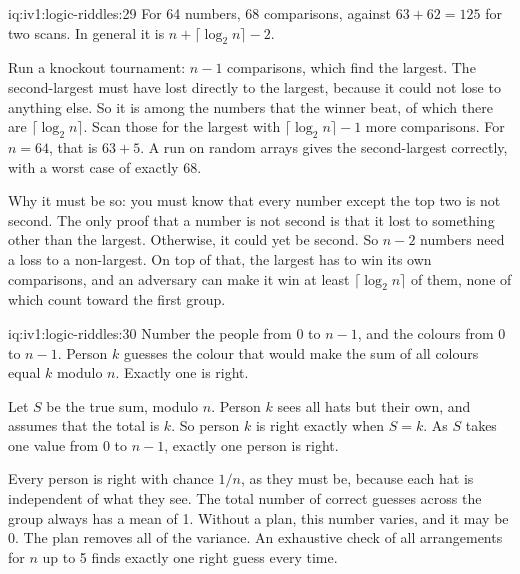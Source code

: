 \begin{solution}{iq:iv1:logic-riddles:29}
For 64 numbers, 68 comparisons, against $63 + 62 = 125$ for two scans. In general it is $n + \lceil \log_2 n \rceil - 2$.

Run a knockout tournament: $n - 1$ comparisons, which find the largest. The second-largest must have lost directly to the largest, because it could not lose to anything else. So it is among the numbers that the winner beat, of which there are $\lceil \log_2 n \rceil$. Scan those for the largest with $\lceil \log_2 n \rceil - 1$ more comparisons. For $n = 64$, that is $63 + 5$. A run on random arrays gives the second-largest correctly, with a worst case of exactly 68.

Why it must be so: you must know that every number except the top two is not second. The only proof that a number is not second is that it lost to something other than the largest. Otherwise, it could yet be second. So $n - 2$ numbers need a loss to a non-largest. On top of that, the largest has to win its own comparisons, and an adversary can make it win at least $\lceil \log_2 n \rceil$ of them, none of which count toward the first group.

\end{solution}

\begin{solution}{iq:iv1:logic-riddles:30}
Number the people from 0 to $n - 1$, and the colours from 0 to $n - 1$. Person $k$ guesses the colour that would make the sum of all colours equal $k$ modulo $n$. Exactly one is right.

Let $S$ be the true sum, modulo $n$. Person $k$ sees all hats but their own, and assumes that the total is $k$. So person $k$ is right exactly when $S = k$. As $S$ takes one value from $0$ to $n - 1$, exactly one person is right.

Every person is right with chance $1/n$, as they must be, because each hat is independent of what they see. The total number of correct guesses across the group always has a mean of 1. Without a plan, this number varies, and it may be 0. The plan removes all of the variance. An exhaustive check of all arrangements for $n$ up to 5 finds exactly one right guess every time.

\end{solution}

